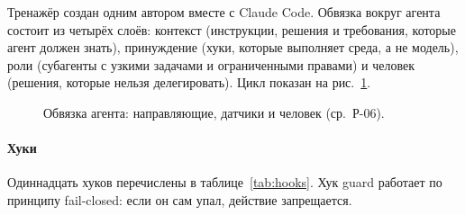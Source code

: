 Тренажёр создан одним автором вместе с Claude Code. Обвязка вокруг агента состоит из четырёх слоёв:
контекст (инструкции, решения и требования, которые агент должен знать), принуждение (хуки, которые
выполняет среда, а не модель), роли (субагенты с узкими задачами и ограниченными правами) и человек
(решения, которые нельзя делегировать). Цикл показан на рис.~\ref{fig:harness}.

\begin{figure}[ht]
\centering
\resizebox{\linewidth}{!}{}
\caption{Обвязка агента: направляющие, датчики и человек (ср.\ Р-06).}\label{fig:harness}
\end{figure}

\paragraph{Хуки} Одиннадцать хуков перечислены в таблице~\ref{tab:hooks}. Хук guard работает по принципу
fail-closed: если он сам упал, действие запрещается.

